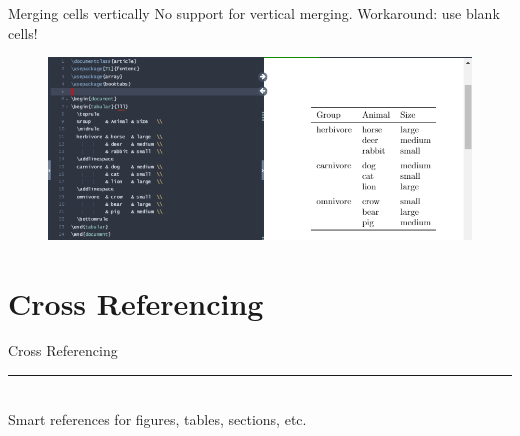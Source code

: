 \documentclass{beamer}
\begin{document}
{  \begin{frame}{Merging cells vertically}
    No support for vertical merging. Workaround: use blank cells!
    \begin{figure}
      \includegraphics[width=0.9\linewidth]{day01-overleaf-11I-table-vertmerge.png}
    \end{figure}
  \end{frame}


  \section{Cross Referencing}

  \begin{frame}[plain]
    \vfill
    \centering
    \begin{beamercolorbox}[sep=8pt,center,shadow=true,rounded=true]{Cross Referencing}
      \insertsectionhead\par%
      \color{davisblue}\noindent\rule{10cm}{1pt} \\
      \footnotesize{Smart references for figures, tables, sections, etc.}
    \end{beamercolorbox}
    \vfill
  \end{frame}

}
\end{document}
